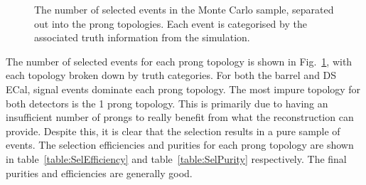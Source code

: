 \begin{figure}
  \centering
  \caption{The number of selected events in the Monte Carlo sample, separated out into the prong topologies.  Each event is categorised by the associated truth information from the simulation.}
  \label{fig:ProngStackSelected}
\end{figure}
The number of selected events for each prong topology is shown in Fig.~\ref{fig:ProngStackSelected}, with each topology broken down by truth categories.  For both the barrel and DS ECal, signal events dominate each prong topology.  The most impure topology for both detectors is the 1 prong topology.  This is primarily due to having an insufficient number of prongs to really benefit from what the reconstruction can provide.  Despite this, it is clear that the selection results in a pure sample of events.  
\newline
\newline
The selection efficiencies and purities for each prong topology are shown in table~\ref{table:SelEfficiency} and table~\ref{table:SelPurity} respectively.  The final purities and efficiencies are generally good.  
